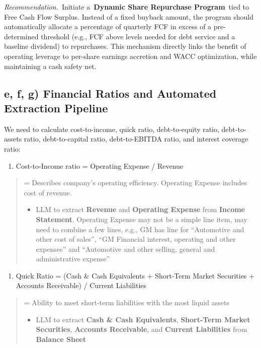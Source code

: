 \documentclass[12pt,a4paper]{article}
\begin{document}
\begin{llmoutput}
\textit{Recommendation.}~Initiate a~\textbf{Dynamic Share Repurchase
Program}~tied to Free Cash Flow Surplus. Instead of a fixed buyback
amount, the program should automatically allocate a percentage of
quarterly FCF in excess of a pre-determined threshold (e.g., FCF above
levels needed for debt service and a baseline dividend) to repurchases.
This mechanism directly links the benefit of operating leverage to
per-share earnings accretion and WACC optimization, while maintaining a
cash safety net.

\end{llmoutput}

\subsection{e, f, g) Financial Ratios and Automated Extraction Pipeline}

We need to calculate cost-to-income, quick ratio, debt-to-equity ratio,
debt-to-assets ratio, debt-to-capital ratio, debt-to-EBITDA ratio, and
interest coverage ratio:

\begin{enumerate}
\def\labelenumi{\arabic{enumi}.}
\item
  Cost-to-Income ratio = Operating Expense / Revenue
\end{enumerate}

\begin{quote}
= Describes company's operating efficiency. Operating Expense includes
cost of revenue.

\begin{itemize}
\item
  LLM to extract \textbf{Revenue} and \textbf{Operating Expense} from
  \textbf{Income Statement}. Operating Expense may not be a simple line
  item, may need to combine a few lines, e.g., GM has line for
  ``Automotive and other cost of sales'', ``GM Financial interest,
  operating and other expenses'' and ``Automotive and other selling,
  general and administrative expense''
\end{itemize}
\end{quote}

\begin{enumerate}
\def\labelenumi{\arabic{enumi}.}
\setcounter{enumi}{1}
\item
  Quick Ratio = (Cash \& Cash Equivalents + Short-Term Market Securities
  + Accounts Receivable) / Current Liabilities
\end{enumerate}

\begin{quote}
= Ability to meet short-term liabilities with the most liquid assets

\begin{itemize}
\item
  LLM to extract \textbf{Cash \& Cash Equivalents}, \textbf{Short-Term
  Market Securities}, \textbf{Accounts Receivable}, and \textbf{Current
  Liabilities} from \textbf{Balance Sheet}
\end{itemize}
\end{quote}
\end{document}

